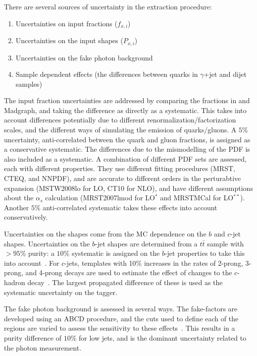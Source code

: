 There are several sources of uncertainty in the extraction procedure:

\begin{enumerate}
\item Uncertainties on input fractions ($f_{x,i}$)
\item Uncertainties on the input shapes ($P_{x,i}$) 
\item Uncertainties on the fake photon background
\item Sample dependent effects (the differences between quarks in $\gamma$+jet and dijet samples)
\end{enumerate}

The input fraction uncertainties are addressed by comparing the fractions in \Pythia and {\sc Madgraph}, and taking the difference as directly as a systematic. This takes into account differences potentially due to different renormalization/factorization scales, and the different ways of simulating the emission of quarks/gluons. A $5\%$ uncertainty, anti-correlated between the quark and gluon fractions, is assigned as a conservative systematic. The differences due to the mismodelling of the PDF is also included as a systematic. A combination of different PDF sets are assessed, each with different properties. They use different fitting procedures (MRST, CTEQ, and NNPDF), and are accurate to different orders in the perturabtive expansion (MSTW2008lo for LO, CT10 for NLO), and have different assumptions about the $\alpha_s$ calculation (MRST2007lmod for LO$^*$ and MRSTMCal for LO$^{**}$). Another $5\%$ anti-correlated systematic takes these effects into account conservatively.

Uncertainties on the shapes come from the MC dependence on the $b$ and $c$-jet shapes. Uncertainties on the $b$-jet shapes are determined from a $t\bar{t}$ sample with $> 95\%$ purity: a $10\%$ systematic is assigned on the $b$-jet properties to take this into account~\cite{Golling:1554107}. For $c$-jets, templates with 10\% increases in the rates of 2-prong, 3-prong, and 4-prong decays are used to estimate the effect of changes to the $c$-hadron decay~\cite{Golling:1554107}. The largest propagated difference of these is used as the systematic uncertainty on the tagger.

The fake photon background is assessed in several ways. The fake-factors are developed using an ABCD procedure, and the cuts used to define each of the regions are varied to assess the sensitivity to these effects~\cite{JES2011}. This results in a purity difference of $10\%$ for low \pt jets, and is the dominant uncertainty related to the photon measurement.


